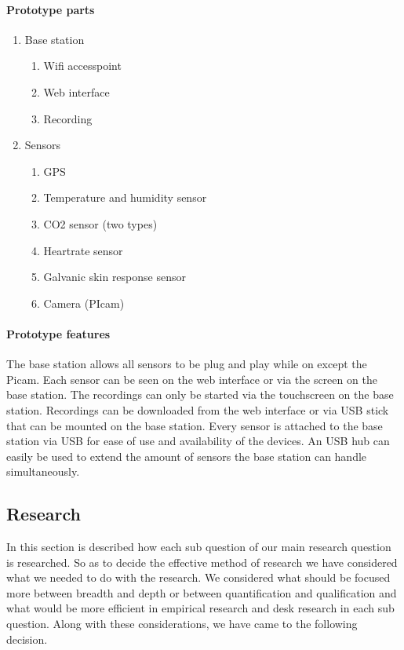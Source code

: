 \documentclass[conference]{IEEEtran}
\begin{document}
		\paragraph{Prototype parts}
			\begin{enumerate}
				\item Base station
					\begin{enumerate}
						\item Wifi accesspoint
						\item Web interface
						\item Recording
					\end{enumerate}
				\item Sensors
					\begin{enumerate}
						\item GPS
						\item Temperature and humidity sensor
						\item CO2 sensor (two types)
						\item Heartrate sensor
						\item Galvanic skin response sensor
						\item Camera (PIcam)
					\end{enumerate}
			\end{enumerate}
		\paragraph{Prototype features}
			The base station allows all sensors to be plug and play while on except the Picam. Each sensor can be seen on the web interface or via the screen on the base station. The recordings can only be started via the touchscreen on the base station. Recordings can be downloaded from the web interface or via USB stick that can be mounted on the base station. Every sensor is attached to the base station via USB for ease of use and availability of the devices. An USB hub can easily be used to extend the amount of sensors the base station can handle simultaneously. 
	\subsection{Research}
		In this section is described how each sub question of our main research question is researched. So as to decide the effective method of research we have considered what we needed to do with the research. We considered what should be focused more between breadth and depth or between quantification and qualification and what would be more efficient in empirical research and desk research in each sub question. Along with these considerations, we have came to the following decision. 
\end{document}

